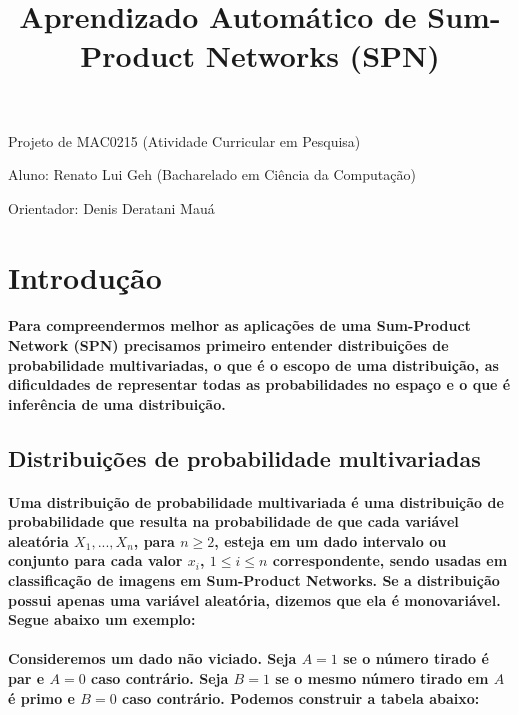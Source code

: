 \documentclass[a4paper,10pt]{article}
\title{\textbf{Aprendizado Automático de Sum-Product Networks (SPN)}}
\theoremstyle{plain}
\begin{document}
\date{}
\author{}
\vspace*{-40pt}
{\let\newpage\relax\maketitle}

Projeto de MAC0215 (Atividade Curricular em Pesquisa)

Aluno: Renato Lui Geh (Bacharelado em Ciência da Computação)

Orientador: Denis Deratani Mauá

\section{Introdução}

\paragraph{
  Para compreendermos melhor as aplicações de uma Sum-Product Network (SPN) precisamos primeiro entender distribuições
de probabilidade multivariadas, o que é o escopo de uma distribuição, as dificuldades de representar todas as 
probabilidades no espaço e o que é inferência de uma distribuição.
}

\subsection{Distribuições de probabilidade multivariadas}

\paragraph{
  Uma distribuição de probabilidade multivariada é uma distribuição de probabilidade que resulta na probabilidade 
de que cada variável aleatória $X_1,...,X_n$, para $n\geq{2}$, esteja em um dado intervalo ou conjunto para cada valor 
$x_i$, $1\leq{i}\leq{n}$ correspondente, sendo usadas em classificação de imagens em Sum-Product Networks. Se a 
distribuição possui apenas uma variável aleatória, dizemos que ela é monovariável. Segue abaixo um exemplo:
}

\paragraph{
  Consideremos um dado não viciado. Seja $A=1$ se o número tirado é par e $A=0$ caso contrário. Seja $B=1$ se o
mesmo número tirado em $A$ é primo e $B=0$ caso contrário. Podemos construir a tabela abaixo:
}
\end{document}
